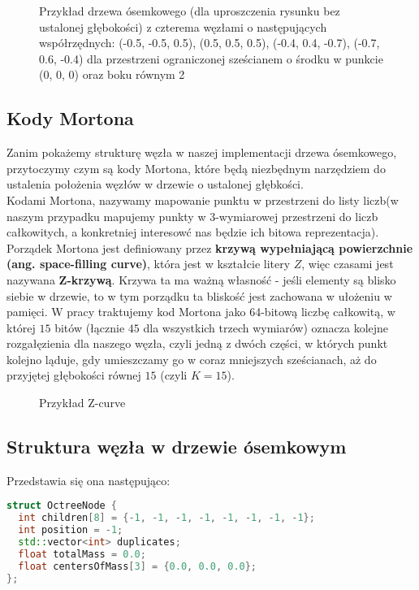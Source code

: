 \documentclass[14pt,twoside,a4paper]{article}
\theoremstyle{definition}
\begin{document}
\begin{figure}
    \centering
    \def\svgwidth{\columnwidth}
    
    \caption{Przykład drzewa ósemkowego (dla uproszczenia rysunku bez ustalonej głębokości) z czterema węzłami o następujących współrzędnych: (-0.5, -0.5, 0.5), (0.5, 0.5, 0.5), (-0.4, 0.4, -0.7), (-0.7, 0.6, -0.4) dla przestrzeni ograniczonej sześcianem o środku w punkcie (0, 0, 0) oraz boku równym 2
    }
\end{figure}
\subsection{\Large Kody Mortona}
Zanim pokażemy strukturę węzła w naszej implementacji drzewa ósemkowego, przytoczymy czym są kody Mortona, które będą niezbędnym narzędziem do ustalenia położenia węzłów w drzewie o ustalonej głębkości.\\
Kodami Mortona, nazywamy mapowanie punktu w przestrzeni do listy liczb(w naszym przypadku mapujemy punkty w 3-wymiarowej przestrzeni do liczb całkowitych, a konkretniej interesowć nas będzie ich bitowa reprezentacja).
Porządek Mortona jest definiowany przez \textbf{krzywą wypełniającą powierzchnie (ang. space-filling curve)}, która jest w kształcie litery $Z$, więc czasami jest nazywana \textbf{Z-krzywą}. Krzywa ta ma ważną własność - jeśli elementy są blisko siebie w drzewie, to w tym porządku ta bliskość jest zachowana w ułożeniu w pamięci. W pracy traktujemy kod Mortona jako 64-bitową liczbę całkowitą, w której $15$ bitów (łącznie $45$ dla wszystkich trzech wymiarów) oznacza kolejne rozgałęzienia dla naszego węzła, czyli jedną z dwóch części, w których punkt kolejno ląduje, gdy umieszczamy go w coraz mniejszych sześcianach, aż do przyjętej głębokości równej $15$ (czyli $K = 15$).

\begin{figure}[h]
    \centering      
    \def\svgscale{0.53}
    
    \caption{Przykład Z-curve}
    \label{fig:krzywa}
\end{figure}

\subsection{\Large Struktura węzła w drzewie ósemkowym}
Przedstawia się ona następująco: 
\begin{lstlisting}[language=C++, frame=single, framerule=2pt, caption=Struktura OctreeNode]
struct OctreeNode {
  int children[8] = {-1, -1, -1, -1, -1, -1, -1, -1};
  int position = -1;
  std::vector<int> duplicates;
  float totalMass = 0.0;
  float centersOfMass[3] = {0.0, 0.0, 0.0};
};
\end{lstlisting}
\end{document}
